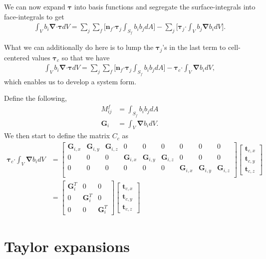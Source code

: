 \documentclass[10pt,letterpaper,notitlepage]{article}
\numberwithin{equation}{section}
\newcommand{\bnabla}{\boldsymbol{\nabla}}
\newcommand{\dotp}{\boldsymbol{\cdot}}
\newcommand{\beq}{\begin{equation*} \begin{aligned}}
\newcommand{\eeq}{\end{aligned}\end{equation*}}
\newcommand{\beqn}{\begin{equation}\begin{aligned}}
\newcommand{\eeqn}{\end{aligned}\end{equation}}
\begin{document}
\begin{appendices}
We can now expand $\boldsymbol{\tau}$ into basis functions and segregate the surface-integrals into face-integrals to get
\beqn 
\int_V b_i \bnabla \dotp \boldsymbol{\tau} dV =
\sum_j \sum_f \biggr[
\mathbf{n}_f \dotp \boldsymbol{\tau}_j \int_{S_f} b_i b_j dA 
\biggr]- 
\sum_j \biggr[
\boldsymbol{\tau}_j \dotp \int_V b_j \bnabla b_i dV
\biggr].
\eeqn 

What we can additionally do here is to lump the $\boldsymbol{\tau}_j$'s in the last term to cell-centered values $\boldsymbol{\tau}_c$ so that we have
\beqn 
\int_V b_i \bnabla \dotp \boldsymbol{\tau} dV =
\sum_j \sum_f \biggr[
\mathbf{n}_f \dotp \boldsymbol{\tau}_j \int_{S_f} b_i b_j dA 
\biggr]- 
\boldsymbol{\tau}_c \dotp \int_V \bnabla b_i dV,
\eeqn 
which enables us to develop a system form.

Define the following,
\beq
M_{ij}^f &=  \int_{S_f} b_i b_j dA \\
\mathbf{G}_i &= \int_V \bnabla b_i dV.
\eeq
We then start to define the matrix $C_c$ as
\beqn 
\boldsymbol{\tau}_c \dotp \int_V \bnabla b_i dV
&=
\begin{bmatrix}
	\mathbf{G}_{i,x} & \mathbf{G}_{i,y} & \mathbf{G}_{i,z} & 0 & 0 & 0 & 0 & 0 & 0\\
	0 & 0 & 0 & \mathbf{G}_{i,x} & \mathbf{G}_{i,y} & \mathbf{G}_{i,z} & 0 & 0 & 0 \\
	0 & 0 & 0 & 0 & 0 & 0 & \mathbf{G}_{i,x} & \mathbf{G}_{i,y} & \mathbf{G}_{i,z} \\
\end{bmatrix}
\begin{bmatrix}
	\mathbf{t}_{c,x} \\ 	\mathbf{t}_{c,y} \\	\mathbf{t}_{c,z}
\end{bmatrix}
\\
&=
\begin{bmatrix}
	\mathbf{G}_i^T & 0 & 0\\
	0 & \mathbf{G}_i^T & 0 \\
	0 & 0 & \mathbf{G}_i^T
\end{bmatrix}
\begin{bmatrix}
	\mathbf{t}_{c,x} \\ 	\mathbf{t}_{c,y} \\	\mathbf{t}_{c,z}
\end{bmatrix}
\eeqn 



\newpage
\section{Taylor expansions}

\end{appendices}
\end{document}
